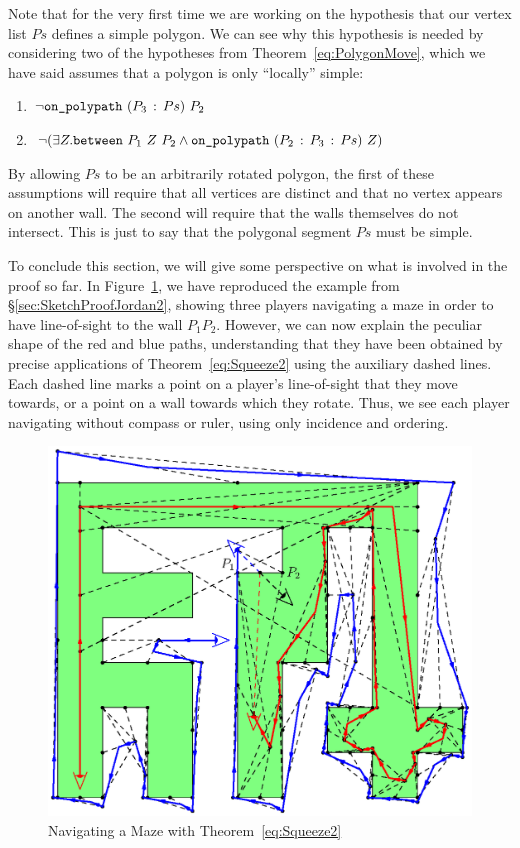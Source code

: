 Note that for the very first time we are working on the hypothesis that our vertex list $Ps$ defines a simple polygon. We can see why this hypothesis is needed by considering two of the hypotheses from Theorem~\ref{eq:PolygonMove}, which we have said assumes that a polygon is only ``locally'' simple:
\begin{enumerate}
\item $\neg\code{on\_polypath}\ (\cons{P_3}{Ps})\ P_2$
\item $\neg(\exists Z. \between{P_1}{Z}{P_2} \wedge \code{on\_polypath}\ (\cons{P_2}{\cons{P_3}{Ps}})\ Z)$
\end{enumerate}

By allowing $Ps$ to be an arbitrarily rotated polygon, the first of these assumptions will require that all vertices are distinct and that no vertex appears on another wall. The second will require that the walls themselves do not intersect. This is just to say that the polygonal segment $Ps$ must be simple.

To conclude this section, we will give some perspective on what is involved in the proof so far. In Figure~\ref{fig:SketchProofJordan2Full}, we have reproduced the example from \S\ref{sec:SketchProofJordan2}, showing three players navigating a maze in order to have line-of-sight to the wall $P_1P_2$. However, we can now explain the peculiar shape of the red and blue paths, understanding that they have been obtained by precise applications of Theorem~\ref{eq:Squeeze2} using the auxiliary dashed lines. Each dashed line marks a point on a player's line-of-sight that they move towards, or a point on a wall towards which they rotate. Thus, we see each player navigating without compass or ruler, using only incidence and ordering.

\begin{figure}
  \centering\includegraphics{jordanVerification2/SketchProofFull}
  \caption{Navigating a Maze with Theorem~\ref{eq:Squeeze2}}
  \label{fig:SketchProofJordan2Full}
\end{figure}

